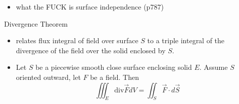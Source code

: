 \documentclass[11pt]{article}
\theoremstyle{definition}
\begin{document}
\begin{multicols}{2}
{\begin{itemize}
      \[ \oint_C \vec{F}\cdot d\vec{r} = \iint_S \text{curl}\vec{F}\cdot d\vec{S} \]
      \item what the FUCK is surface independence (p787)
    \end{itemize}
    Divergence Theorem
    \begin{itemize}
      \item relates flux integral of field over surface $S$ to a triple integral of the divergence of the field over the solid enclosed by $S$.
      \item Let $S$ be a piecewise smooth close surface enclosing solid $E$. Assume $S$ oriented outward, let $F$ be a field. Then
      \[ \iiint_E \text{div}\vec{F}dV = \iint_S \vec{F}\cdot d\vec{S} \]
    \end{itemize}
  }
\end{multicols}
\end{document}
